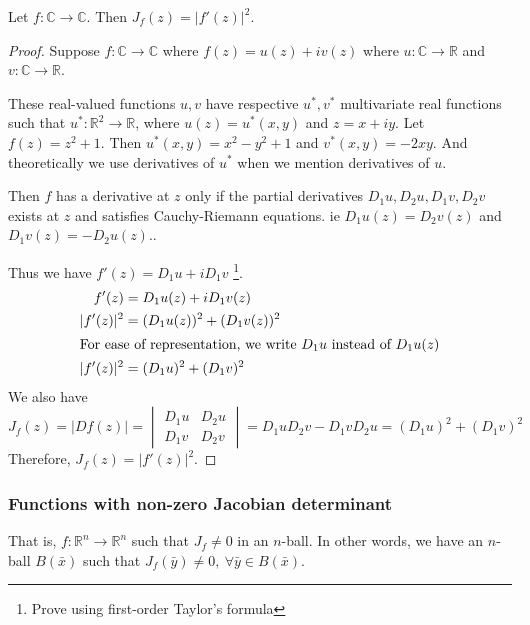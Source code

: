 \begin{theorem}
Let $f : \mathbb{C} \to \mathbb{C}$.
Then $J_f(z) = |f'(z)|^2$.
\end{theorem}
\begin{proof}
Suppose $f : \mathbb{C} \to \mathbb{C}$ where $f(z) = u(z) + iv(z)$ where $u : \mathbb{C} \to \mathbb{R}$ and $v : \mathbb{C} \to \mathbb{R}$.
\begin{commentary}These real-valued functions $u,v$ have respective $u^*,v^*$ multivariate real functions such that $u^* : \mathbb{R}^2 \to \mathbb{R}$, where $u(z) = u^*(x,y)$ and $z = x+iy$.
Let $f(z) = z^2+1$.
Then $u^*(x,y) = x^2-y^2+1$ and $v^*(x,y) = -2xy$.
And theoretically we use derivatives of $u^*$ when we mention derivatives of $u$.\end{commentary}

Then $f$ has a derivative at $z$ only if the partial derivatives $D_1u,D_2u,D_1v,D_2v$ exists at $z$ and satisfies Cauchy-Riemann equations.
ie $D_1u(z) = D_2v(z)$ and $D_1v(z) = -D_2u(z)$.\cite[Theorem 5.22]{apostol}.

Thus we have $f'(z) = D_1u + iD_1v$ \cite[Theorem 12.6]{apostol}\footnote{Prove using first-order Taylor's formula}.
\begin{align*}
	f'(z) & = D_1u(z) + iD_1v(z) \\
	|f'(z)|^2 & = (D_1u(z))^2 + (D_1v(z))^2\\
	\intertext{For ease of representation, we write $D_1u$ instead of $D_1u(z)$}
	|f'(z)|^2 & = (D_1u)^2 + (D_1v)^2
\end{align*}
We also have
\[ J_f(z) = |Df(z)| = \begin{vmatrix} D_1u & D_2u \\ D_1v & D_2v \end{vmatrix} = D_1uD_2v - D_1vD_2u = (D_1u)^2 + (D_1v)^2 \]
Therefore, $J_f(z) = |f'(z)|^2$.
\end{proof}

\subsubsection{Functions with non-zero Jacobian determinant}
\begin{commentary}
That is, $f : \mathbb{R}^n \to \mathbb{R}^n$ such that $J_f \ne 0$ in an $n$-ball. In other words, we have an $n$-ball $B(\bar{x})$ such that $J_f(\bar{y}) \ne 0,\ \forall \bar{y} \in B(\bar{x})$.
\end{commentary}

